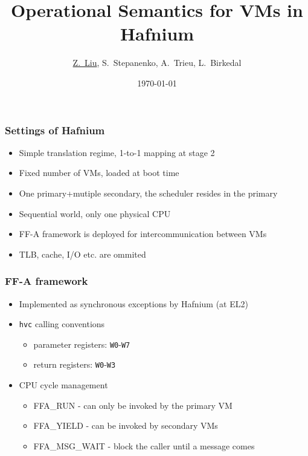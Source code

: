 \documentclass{beamer}
\title{Operational Semantics for VMs in Hafnium}
\institute{Aarhus University}
\date{\today}
\author[Liu, Stepanenko, Trieu, Birkedal]
{\underline{Z.~Liu}, S.~Stepanenko, A.~Trieu, L.~Birkedal}
\institute[Aarhus]
{
  Department of Computer Science\\
  Aarhus University
}
\begin{document}
\frame{\titlepage}



% 

\begin{frame}
  \frametitle{Settings of Hafnium}
  \begin{itemize}
    \item Simple translation regime, 1-to-1 mapping at stage 2
    \item Fixed number of VMs, loaded at boot time
    \item One primary+mutiple secondary, the scheduler resides in the primary
    \item Sequential world, only one physical CPU
    \item FF-A framework is deployed for intercommunication between VMs
    \item TLB, cache, I/O etc. are ommited
  \end{itemize}
\end{frame}

\begin{frame}
  \frametitle{FF-A framework}
  \begin{itemize}
    \item Implemented as synchronous exceptions by Hafnium (at EL2)
    \item \texttt{hvc} calling conventions
      \begin{itemize}
        \item parameter registers: \texttt{W0}-\texttt{W7}
          \item return registers: \texttt{W0}-\texttt{W3}
          \end{itemize}
    \item CPU cycle management
      \begin{itemize}
        \item FFA\_RUN - can only be invoked by the primary VM
        \item FFA\_YIELD - can be invoked by secondary VMs
        \item FFA\_MSG\_WAIT - block the caller until a message comes
      \end{itemize}

  \end{itemize}
\end{frame}
\end{document}
